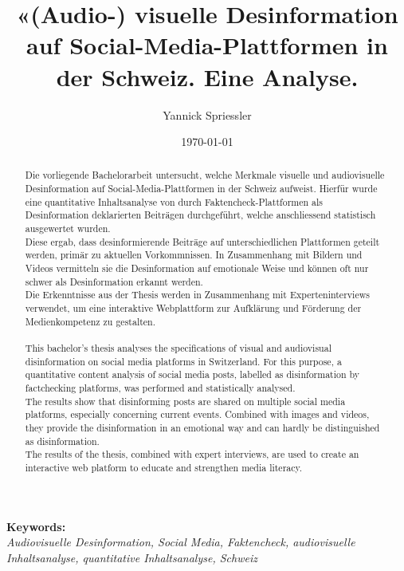 \documentclass[12pt,a4paper]{article}        %
\title{«(Audio-) visuelle Desinformation auf Social-Media-Plattformen in der Schweiz. Eine Analyse.}        %
\author{Yannick Spriessler}     %
\date{\today}     %
\begin{document}
\begin{titlingpage} %
  
  \nocite{howard_trees_2017}  %
\end{titlingpage}
\pagebreak      %
\setcounter{page}{1}    %

\renewcommand{\abstractname}{Abstract}
\begin{abstract}
  \setlength{\parindent}{0pt}
Die vorliegende Bachelorarbeit untersucht, welche Merkmale visuelle und audiovisuelle Desinformation auf Social-Media-Plattformen in der Schweiz aufweist. Hierfür wurde eine quantitative Inhaltsanalyse von durch Faktencheck-Plattformen als Desinformation deklarierten Beiträgen durchgeführt, welche anschliessend statistisch ausgewertet wurden.\\
Diese ergab, dass desinformierende Beiträge auf unterschiedlichen Plattformen geteilt werden, primär zu aktuellen Vorkommnissen. In Zusammenhang mit Bildern und Videos vermitteln sie die Desinformation auf emotionale Weise und können oft nur schwer als Desinformation erkannt werden.\\
Die Erkenntnisse aus der Thesis werden in Zusammenhang mit Experteninterviews verwendet, um eine interaktive Webplattform zur Aufklärung und Förderung der Medienkompetenz zu gestalten.
\\
\\
This bachelor's thesis analyses the specifications of visual and audiovisual disinformation on social media platforms in Switzerland. For this purpose, a quantitative content analysis of social media posts, labelled as disinformation by factchecking platforms, was performed and statistically analysed.\\
The results show that disinforming posts are shared on multiple social media platforms, especially concerning current events. Combined with images and videos, they provide the disinformation in an emotional way and can hardly be distinguished as disinformation.\\
The results of the thesis, combined with expert interviews, are used to create an interactive web platform to educate and strengthen media literacy.
\end{abstract}

\vfill
\textbf{Keywords:}\\ \textit{Audiovisuelle Desinformation, Social Media, Faktencheck, audiovisuelle Inhaltsanalyse, quantitative Inhaltsanalyse, Schweiz}
\end{document}
